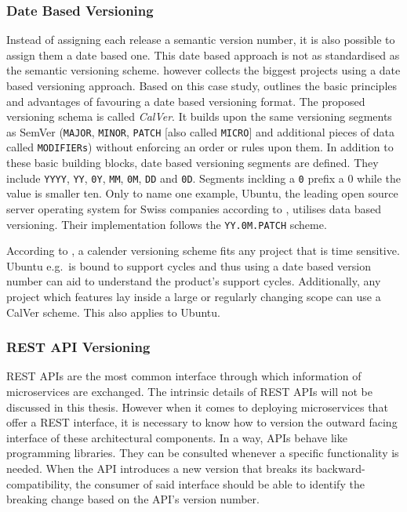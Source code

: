 \subsubsection{Date Based Versioning}%
\label{ssub:Date_Based_Versioning}
Instead of assigning each release a semantic version number, it is also
possible to assign them a date based one. This date based approach is not as
standardised as the semantic versioning scheme.
\autocite{HashemiCalendarVersioning2017} however collects the biggest projects
using a date based versioning approach. Based on this case study,
\autocite{HashemiCalendarVersioning2017} outlines the basic principles and
advantages of favouring a date based versioning format. The proposed versioning
schema is called \textit{CalVer}. It builds upon the same versioning segments
as SemVer (\texttt{MAJOR}, \texttt{MINOR}, \texttt{PATCH} [also called
\texttt{MICRO}] and additional pieces of data called \texttt{MODIFIERs})
without enforcing an order or rules upon them. In addition to these basic
building blocks, date based versioning segments are defined. They include
\texttt{YYYY}, \texttt{YY}, \texttt{0Y}, \texttt{MM}, \texttt{0M}, \texttt{DD}
and \texttt{0D}. Segments inclding a \texttt{0} prefix a 0 while the value is
smaller ten. Only to name one example, Ubuntu, the leading open source server
operating system for Swiss companies according to
\autocite{SwissICTWelcheOpenSource2018}, utilises data based versioning. Their
implementation follows the \texttt{YY.0M.PATCH} scheme.

According to \autocite{HashemiCalendarVersioning2017}, a calender versioning
scheme fits any project that is time sensitive. Ubuntu e.g.\ is bound to
support cycles and thus using a date based version number can aid to understand
the product's support cycles. Additionally, any project which features lay
inside a large or regularly changing scope can use a CalVer scheme. This also
applies to Ubuntu.

\subsubsection{REST API Versioning}%
\label{ssub:API_Versioning}
\ac{REST} \acp{API} are the most common interface through which information of
microservices are exchanged. The intrinsic details of \ac{REST} \acp{API} will
not be discussed in this thesis. However when it comes to deploying
microservices that offer a \ac{REST} interface, it is necessary to know how to
version the outward facing interface of these architectural components. In a
way, \acp{API} behave like programming libraries. They can be consulted
whenever a specific functionality is needed. When the \ac{API} introduces a new
version that breaks its backward-compatibility, the consumer of said interface
should be able to identify the breaking change based on the \ac{API}'s version
number.

